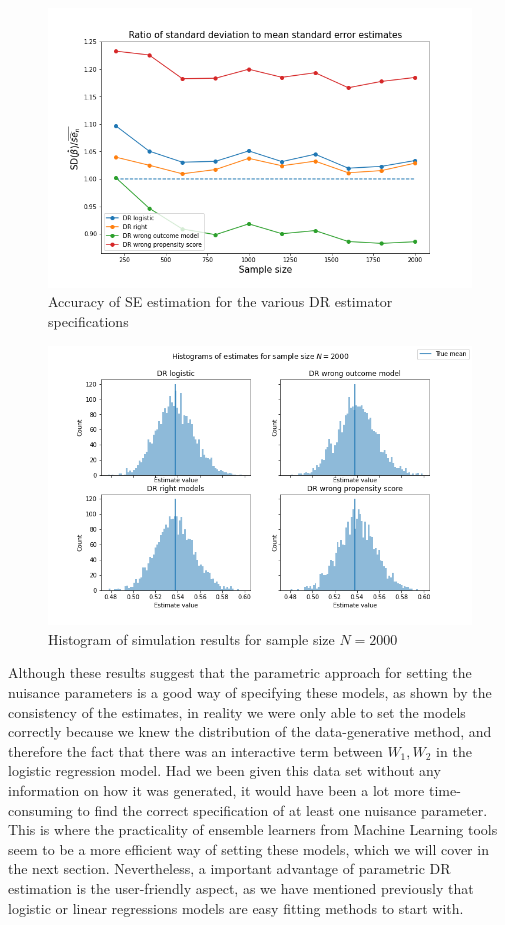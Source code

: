 \documentclass[12pt,twoside]{article}
\begin{document}
\begin{figure}[h!]
    \centering
    \includegraphics[width = 0.9\columnwidth]{figures/SEpara.png}
    \caption{Accuracy of \citet{lunceford_davidian} SE estimation for the various DR estimator specifications}
    \label{figSEpara}
\end{figure}

\begin{figure}[h!]
    \centering
    \includegraphics[width = 0.9\columnwidth]{figures/histpara.png}
    \caption{Histogram of simulation results for  sample size $N = 2000$}
    \label{fighistpara}
\end{figure}
Although these results suggest that the parametric approach for setting the nuisance parameters is a good way of specifying these models, as shown by the consistency of the estimates, in reality we were only able to set the models correctly because we knew the distribution of the data-generative method, and therefore the fact that there was an interactive term between $W_1,W_2$ in the logistic regression model. Had we been given this data set without any information on how it was generated, it would have been a lot more time-consuming to find the correct specification of at least one nuisance parameter. This is where the practicality of ensemble learners from Machine Learning tools seem to be a more efficient way of setting these models, which we will cover in the next section. Nevertheless, a important advantage of parametric DR estimation is the user-friendly aspect, as we have mentioned previously that logistic or linear regressions models are easy fitting methods to start with.
\end{document}
